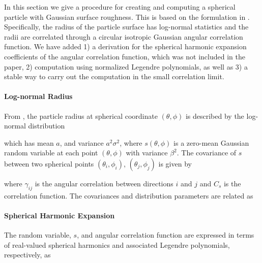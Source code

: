 In this section we give a procedure for creating and computing a spherical particle with Gaussian surface roughness. This is based on the formulation in \cite{muinonen1996light}. Specifically, the radius of the particle surface has log-normal statistics and the radii are correlated through a circular isotropic Gaussian angular correlation function. We have added 1) a derivation for the spherical harmonic expansion coefficients of the angular correlation function, which was not included in the paper, 2) computation using normalized Legendre polynomials, as well as 3) a stable way to carry out the computation in the small correlation limit.

\paragraph{Log-normal Radius}
From \cite{muinonen1996light}, the particle radius at spherical coordinate $(\theta,\phi)$ is described by the log-normal distribution

\noindent which has mean $a$, and variance $a^2\sigma^2$, where $s(\theta,\phi)$ is a zero-mean Gaussian random variable at each point $(\theta,\phi)$ with variance $\beta^2$.  The covariance of $s$ between two spherical points $(\theta_i,\phi_i)$, $(\theta_j,\phi_j)$ is given by 

\noindent where $\gamma_{ij}$ is the angular correlation between directions $i$ and $j$ and $C_s$ is the correlation function.  The covariances and distribution parameters are related as 


\paragraph{Spherical Harmonic Expansion}
The random variable, $s$, and angular correlation function are expressed in terms of real-valued spherical harmonics and associated Legendre polynomials, respectively, as


